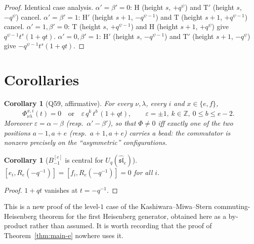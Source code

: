 \documentclass[11pt]{article}
\theoremstyle{plain}
\newtheorem{corollary}[theorem]{Corollary}
\theoremstyle{definition}
\newcommand{\Z}{\mathbb{Z}}
\begin{document}
\begin{proof}
Identical case analysis. $\alpha'=\beta'=0$: $\mathrm H$ (height $s$, $+q^{\psi}$)
and $\mathrm T'$ (height $s$, $-q^{\psi}$) cancel. $\alpha'=\beta'=1$:
$\mathrm H'$ (height $s+1$, $-q^{\psi-1}$) and $\mathrm T$ (height $s+1$,
$+q^{\psi-1}$) cancel. $\alpha'=1,\beta'=0$: $\mathrm T$ (height $s$, $+q^{\psi-1}$)
and $\mathrm H$ (height $s+1$, $+q^{\psi}$) give $q^{\psi-1}t^s(1+qt)$.
$\alpha'=0,\beta'=1$: $\mathrm H'$ (height $s$, $-q^{\psi-1}$) and $\mathrm T'$
(height $s+1$, $-q^{\psi}$) give $-q^{\psi-1}t^s(1+qt)$.
\end{proof}

\section{Corollaries}

\begin{corollary}[Q59, affirmative]\label{cor:Q59}
For every $\nu,\lambda$, every $i$ and $x\in\{e,f\}$,
\[
\Phi^{x,i}_{\nu\lambda}(t)=0\quad\text{or}\quad \varepsilon\,q^k\,t^b\,(1+qt),
\qquad \varepsilon=\pm1,\ k\in\Z,\ 0\le b\le e-2 .
\]
Moreover $\varepsilon=\alpha-\beta$ (resp.\ $\alpha'-\beta'$), so that
$\Phi\neq0$ \emph{iff} exactly one of the two positions $a-1,a+e$ (resp.\
$a+1,a+e$) carries a bead: the commutator is nonzero precisely on the
``asymmetric'' configurations.
\end{corollary}

\begin{corollary}[$B^{[e]}_{-1}$ is central for $U_q(\widehat{\mathfrak{sl}}_e)$]
$[e_i,R_e(-q^{-1})]=[f_i,R_e(-q^{-1})]=0$ for all $i$.
\end{corollary}
\begin{proof}
$1+qt$ vanishes at $t=-q^{-1}$.
\end{proof}

\noindent This is a new proof of the level-$1$ case of the Kashiwara--Miwa--Stern
commuting-Heisenberg theorem for the first Heisenberg generator, obtained here as a
by-product rather than assumed. It is worth recording that the proof of
Theorem~\ref{thm:main-e} nowhere uses it.
\end{document}
